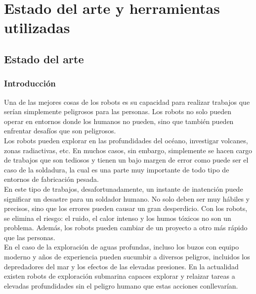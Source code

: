 

\chapter[Estado del arte y herramientas utilizadas]{Estado del arte y herramientas utilizadas}
\label{chap:herramientas}


\section{ Estado del arte }

\subsection{Introducción}


Una de las mejores cosas de los robots es su capacidad para realizar trabajos que serían simplemente peligrosos para las personas. Los robots no solo pueden operar en entornos
donde los humanos no pueden, sino que también pueden enfrentar desafíos que son peligrosos.\\

Los robots pueden explorar en las profundidades del océano, investigar volcanes, zonas radiactivas, etc. En muchos casos, sin embargo, simplemente se hacen cargo de trabajos
que son tediosos y tienen un bajo margen de error como puede ser el caso de la soldadura, la cual es una parte muy importante de todo tipo de entornos de fabricación pesada.\\

En este tipo de trabajos, desafortunadamente, un instante de inatención puede significar un desastre para un soldador humano. No solo deben ser muy hábiles y precisos, sino que los errores pueden 
causar un gran desperdicio. Con los robots, se elimina el riesgo: el ruido, el calor intenso y los humos tóxicos no son un problema. Además, los robots pueden cambiar de un
proyecto a otro más rápido que las personas.\\

En el caso de la exploración de aguas profundas, incluso los buzos con equipo moderno y años de experiencia pueden sucumbir a diversos peligros, incluidos los depredadores del
mar y los efectos de las elevadas presiones. En la actualidad existen robots de exploración submarina capaces explorar y relaizar tareas 
a elevadas profundidades sin el peligro humano que estas acciones conllevarían.\\


